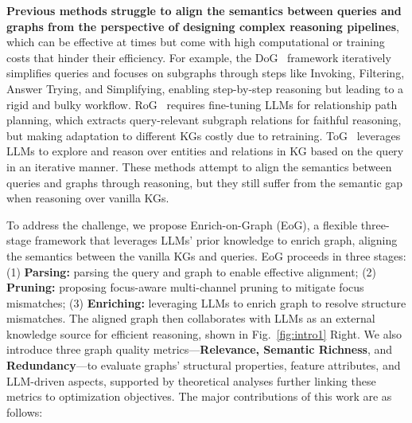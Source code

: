 \documentclass[11pt]{article}
\begin{document}
\textbf{Previous methods struggle to align the semantics between queries and graphs from the perspective of designing complex reasoning pipelines}, which can be effective at times but come with high computational or training costs that hinder their efficiency.
For example, the DoG~\cite{ma2025debate} framework iteratively simplifies queries and focuses on subgraphs through steps like Invoking, Filtering, Answer Trying, and Simplifying, enabling step-by-step reasoning but leading to a rigid and bulky workflow. RoG~\cite{luo2024reasoninggraphsfaithfulinterpretable} requires fine-tuning LLMs for relationship path planning, which extracts query-relevant subgraph relations for faithful reasoning, but making adaptation to different KGs costly due to retraining. ToG~\cite{sun2023thinkongraph} leverages LLMs to explore and reason over entities and relations in KG based on the query in an iterative manner. 
These methods attempt to align the semantics between queries and graphs through reasoning, but they still suffer from the semantic gap when reasoning over vanilla KGs.


To address the challenge, we propose Enrich-on-Graph (EoG), a flexible three-stage framework that leverages LLMs' prior knowledge to enrich graph, aligning the semantics between the vanilla KGs and queries. 
EoG proceeds in three stages: 
(1) \textbf{Parsing:} parsing the query and graph to enable effective alignment;
(2) \textbf{Pruning:} proposing focus-aware multi-channel pruning to mitigate focus mismatches;
(3) \textbf{Enriching:} leveraging LLMs to enrich graph to resolve structure mismatches.
The aligned graph then collaborates with LLMs as an external knowledge source for efficient reasoning, shown in Fig.~\ref{fig:intro1} Right. 
We also introduce three graph quality metrics—\textbf{Relevance, Semantic Richness}, and \textbf{Redundancy}—to evaluate graphs' structural properties, feature attributes, and LLM-driven aspects, supported by theoretical analyses further linking these metrics to optimization objectives.
The major contributions of this work are as follows:
\end{document}
